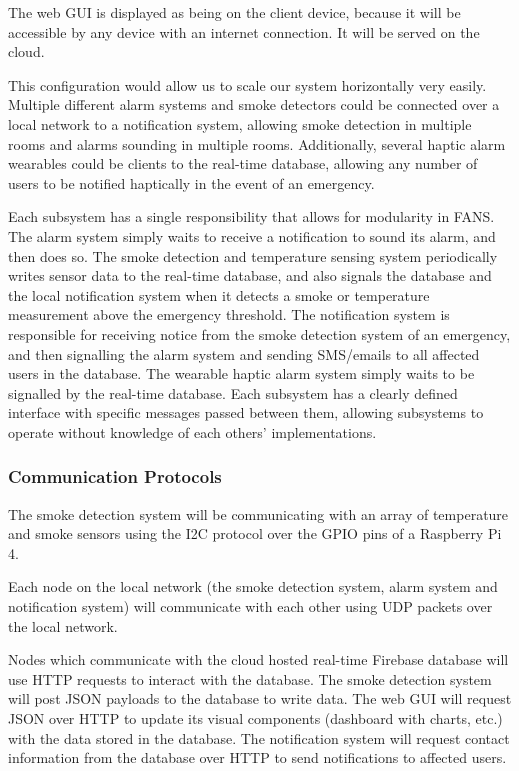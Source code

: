 The web GUI is displayed as being on the client device, because it will be accessible by any device with an internet
connection. It will be served on the cloud.

This configuration would allow us to scale our system horizontally very easily. Multiple different alarm systems and
smoke detectors could be connected over a local network to a notification system, allowing smoke detection in multiple
rooms and alarms sounding in multiple rooms. Additionally, several haptic alarm wearables could be clients to the
real-time database, allowing any number of users to be notified haptically in the event of an emergency.

Each subsystem has a single responsibility that allows for modularity in FANS. The alarm system simply waits to receive
a notification to sound its alarm, and then does so. The smoke detection and temperature sensing system periodically
writes sensor data to the real-time database, and also signals the database and the local notification system when it
detects a smoke or temperature measurement above the emergency threshold. The notification system is responsible for
receiving notice from the smoke detection system of an emergency, and then signalling the alarm system and sending
SMS/emails to all affected users in the database. The wearable haptic alarm system simply waits to be signalled by the
real-time database. Each subsystem has a clearly defined interface with specific messages passed between them, allowing
subsystems to operate without knowledge of each others’ implementations.

\subsubsection{Communication Protocols}

The smoke detection system will be communicating with an array of temperature and smoke sensors using the I2C protocol
over the GPIO pins of a Raspberry Pi 4.

Each node on the local network (the smoke detection system, alarm system and notification system) will communicate with
each other using UDP packets over the local network.

Nodes which communicate with the cloud hosted real-time Firebase database will use HTTP requests to interact with the
database. The smoke detection system will post JSON payloads to the database to write data. The web GUI will request
JSON over HTTP to update its visual components (dashboard with charts, etc.) with the data stored in the database. The
notification system will request contact information from the database over HTTP to send notifications to affected
users.

